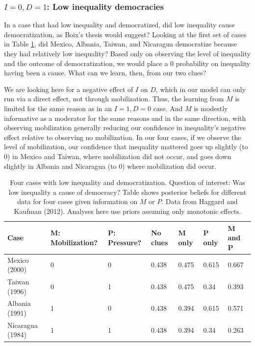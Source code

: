 \documentclass[12pt,]{book}
\begin{document}
\hypertarget{i0-d1-low-inequality-democracies}{%
\subsubsection{\texorpdfstring{\(I=0, D=1\): Low inequality democracies}{I=0, D=1: Low inequality democracies}}\label{i0-d1-low-inequality-democracies}}

In a case that had low inequality and democratized, did low inequality cause democratization, as Boix's thesis would suggest? Looking at the first set of cases in Table \ref{tab:HK8cases1}, did Mexico, Albania, Taiwan, and Nicaragua democratize because they had relatively low inequality? Based only on observing the level of inequality and the outcome of democratization, we would place a 0 probability on inequality having been a cause. What can we learn, then, from our two clues?

We are looking here for a negative effect of \(I\) on \(D\), which in our model can only run via a direct effect, not through mobilization. Thus, the learning from \(M\) is limited for the same reason as in an \(I=1, D=0\) case. And \(M\) is modestly informative as a moderator for the same reasons and in the same direction, with observing mobilization generally reducing our confidence in inequality's negative effect relative to observing no mobilization. In our four cases, if we observe the level of mobilization, our confidence that inequality mattered goes up slightly (to 0) in Mexico and Taiwan, where mobilization did not occur, and goes down slightly in Albania and Nicaragua (to 0) where mobilization did occur.

\begin{table}[t]

\caption{\label{tab:HK8cases1}Four cases with low inequality and  democratization. Question of interest: Was low inequality a cause of democracy? Table shows posterior beliefs for different data for four cases given information on $M$ or $P$. Data from Haggard and Kaufman (2012). Analyses here use priors assuming only monotonic effects.}
\centering
\begin{tabular}{l|l|l|l|l|l|l}
\hline
Case & M: Mobilization? & P: Pressure? & No clues & M only & P only & M and P\\
\hline
Mexico (2000) & 0 & 0 & 0.438 & 0.475 & 0.615 & 0.667\\
\hline
Taiwan (1996) & 0 & 1 & 0.438 & 0.475 & 0.34 & 0.393\\
\hline
Albania (1991) & 1 & 0 & 0.438 & 0.394 & 0.615 & 0.571\\
\hline
Nicaragua (1984) & 1 & 1 & 0.438 & 0.394 & 0.34 & 0.263\\
\hline
\end{tabular}
\end{table}
\end{document}
